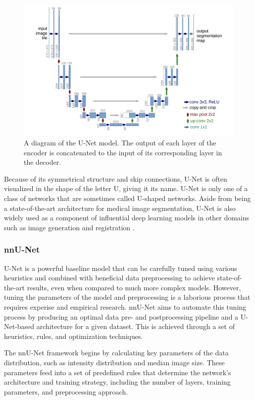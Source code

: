 \begin{figure}[h!]
 \centering
 \includegraphics[width=0.8\linewidth]{images/unet-arch}
 \caption{A diagram of the U-Net model. The output of each layer of the encoder is concatenated to the input of its corresponding layer in the decoder. \cite{ronnebergerUNetConvolutionalNetworks2015d}}
 \label{fig:unet-arch}
 \end{figure}

Because of its symmetrical structure and skip connections, U-Net is often visualized in the shape of the letter U, giving it its name. U-Net is only one of a class of networks that are sometimes called U-shaped networks. Aside from being a state-of-the-art architecture for medical image segmentation, U-Net is also widely used as a component of influential deep learning models in other domains such as image generation \cite{rombach2021highresolution} and registration \cite{sinclairAtlasISTNJointSegmentation2022a}.

\subsubsection{nnU-Net}

U-Net is a powerful baseline model that can be carefully tuned using various heuristics and combined with beneficial data preprocessing to achieve state-of-the-art results, even when compared to much more complex models. However, tuning the parameters of the model and preprocessing is a laborious process that requires experise and empirical research. nnU-Net \cite{isenseeNnUNetSelfconfiguringMethod2021} aims to automate this tuning process by producing an optimal data pre- and postprocessing pipeline and a U-Net-based architecture for a given dataset. This is achieved through a set of heuristics, rules, and optimization techniques.

The nnU-Net framework begins by calculating key parameters of the data distribution, such as intensity distribution and median image size. These parameters feed into a set of predefined rules that determine the network's architecture and training strategy, including the number of layers, training parameters, and preprocessing approach.

